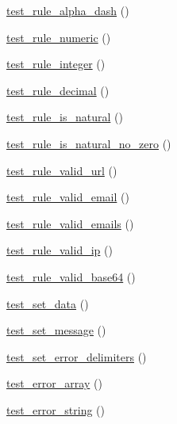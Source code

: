 \begin{DoxyCompactItemize}
\item 
\hyperlink{class_form__validation__test_a02278fcb974cd96638afca72931e534b}{test\+\_\+rule\+\_\+alpha\+\_\+dash} ()
\item 
\hyperlink{class_form__validation__test_acffed236a9860f9ec0760adfa6cfab14}{test\+\_\+rule\+\_\+numeric} ()
\item 
\hyperlink{class_form__validation__test_a8112afaddb8124b3cf99b627cef71103}{test\+\_\+rule\+\_\+integer} ()
\item 
\hyperlink{class_form__validation__test_a6e656aa3822493ab265a776baa2c5c41}{test\+\_\+rule\+\_\+decimal} ()
\item 
\hyperlink{class_form__validation__test_abdca321712ae5cd229ccc1addfea4cf4}{test\+\_\+rule\+\_\+is\+\_\+natural} ()
\item 
\hyperlink{class_form__validation__test_a80ecf8848faefbcbab55db54eea37d8e}{test\+\_\+rule\+\_\+is\+\_\+natural\+\_\+no\+\_\+zero} ()
\item 
\hyperlink{class_form__validation__test_a12347e497d236029d63b96c215782c26}{test\+\_\+rule\+\_\+valid\+\_\+url} ()
\item 
\hyperlink{class_form__validation__test_a20ac2f2329783d1a27ab9f3278267c36}{test\+\_\+rule\+\_\+valid\+\_\+email} ()
\item 
\hyperlink{class_form__validation__test_a9ad7251e7803ccc713f81e7f1a8598da}{test\+\_\+rule\+\_\+valid\+\_\+emails} ()
\item 
\hyperlink{class_form__validation__test_a2c15c9e47e20218ca926e3ddb40bf589}{test\+\_\+rule\+\_\+valid\+\_\+ip} ()
\item 
\hyperlink{class_form__validation__test_ab74e970dfe948fee7c783135ae33cd28}{test\+\_\+rule\+\_\+valid\+\_\+base64} ()
\item 
\hyperlink{class_form__validation__test_a743fb3b803188015203b6494698b9144}{test\+\_\+set\+\_\+data} ()
\item 
\hyperlink{class_form__validation__test_a32e5cb1cce37e22da6b29548cd49e0a0}{test\+\_\+set\+\_\+message} ()
\item 
\hyperlink{class_form__validation__test_aff1c6fda4943af6cafc2a45900850f72}{test\+\_\+set\+\_\+error\+\_\+delimiters} ()
\item 
\hyperlink{class_form__validation__test_aed05f2587277f837ade1e10666fd648d}{test\+\_\+error\+\_\+array} ()
\item 
\hyperlink{class_form__validation__test_af6df1cc9e7b6a321ce8cc651ed1ca0f4}{test\+\_\+error\+\_\+string} ()
\item 

\end{DoxyCompactItemize}
